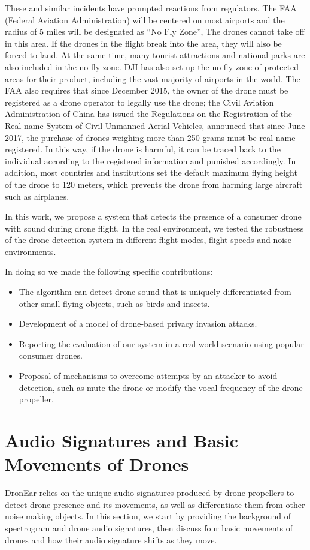 \documentclass{sig-alternate-10pt}
\begin{document}
These and similar incidents have prompted reactions from regulators. The FAA (Federal Aviation Administration) will be centered on most airports and the radius of 5 miles will be designated as “No Fly Zone”, The drones cannot take off in this area. If the drones in the flight break into the area, they will also be forced to land. At the same time, many tourist attractions and national parks are also included in the no-fly zone. DJI has also set up the no-fly zone of protected areas for their product, including the vast majority of airports in the world. The FAA also requires that since December 2015, the owner of the drone must be registered as a drone operator to legally use the drone; the Civil Aviation Administration of China has issued the Regulations on the Registration of the Real-name System of Civil Unmanned Aerial Vehicles, announced that since June 2017, the purchase of drones weighing more than 250 grams must be real name registered. In this way, if the drone is harmful, it can be traced back to the individual according to the registered information and punished accordingly. In addition, most countries and institutions set the default maximum flying height of the drone to 120 meters, which prevents the drone from harming large aircraft such as airplanes.

In this work, we propose a system that detects the presence of a consumer drone with sound during drone flight. In the real environment, we tested the robustness of the drone detection system in different flight modes, flight speeds and noise environments.

In doing so we made the following specific contributions:
\begin{itemize}
\item The algorithm can detect drone sound that is uniquely differentiated from other small flying objects, such as birds and insects.
\item Development of a model of drone-based privacy invasion attacks.
\item Reporting the evaluation of our system in a real-world scenario using popular consumer drones.
\item Proposal of mechanisms to overcome attempts by an attacker to avoid detection, such as mute the drone or modify the vocal frequency of the drone propeller.
\end{itemize}
\section{ Audio Signatures and Basic Movements of Drones}
DronEar relies on the unique audio signatures produced by drone propellers to detect drone presence and its movements, as well as differentiate them from other noise making objects.  In this section, we start by providing the background of spectrogram and drone audio signatures, then discuss four basic movements of drones and how their audio signature shifts as they move.
\end{document}
